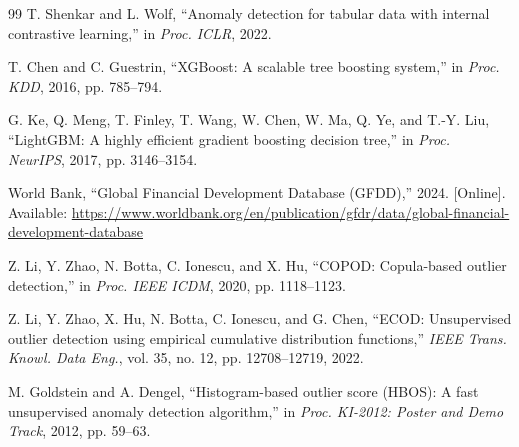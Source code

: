 \documentclass[journal]{IEEEtran}
\begin{document}
\begin{thebibliography}{99}
T. Shenkar and L. Wolf, ``Anomaly detection for tabular data with internal contrastive learning,'' in \textit{Proc. ICLR}, 2022.

T. Chen and C. Guestrin, ``XGBoost: A scalable tree boosting system,'' in \textit{Proc. KDD}, 2016, pp. 785--794.

G. Ke, Q. Meng, T. Finley, T. Wang, W. Chen, W. Ma, Q. Ye, and T.-Y. Liu, ``LightGBM: A highly efficient gradient boosting decision tree,'' in \textit{Proc. NeurIPS}, 2017, pp. 3146--3154.

{World Bank}, ``Global Financial Development Database (GFDD),'' 2024. [Online]. Available: \url{https://www.worldbank.org/en/publication/gfdr/data/global-financial-development-database}

Z. Li, Y. Zhao, N. Botta, C. Ionescu, and X. Hu, ``COPOD: Copula-based outlier detection,'' in \textit{Proc. IEEE ICDM}, 2020, pp. 1118--1123.

Z. Li, Y. Zhao, X. Hu, N. Botta, C. Ionescu, and G. Chen, ``ECOD: Unsupervised outlier detection using empirical cumulative distribution functions,'' \textit{IEEE Trans. Knowl. Data Eng.}, vol. 35, no. 12, pp. 12708--12719, 2022.

M. Goldstein and A. Dengel, ``Histogram-based outlier score (HBOS): A fast unsupervised anomaly detection algorithm,'' in \textit{Proc. KI-2012: Poster and Demo Track}, 2012, pp. 59--63.

\end{thebibliography}
\end{document}
